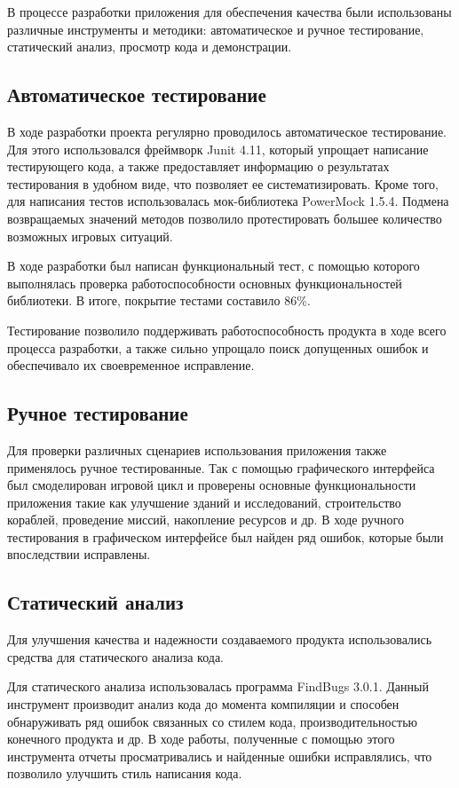 В процессе разработки приложения для обеспечения качества были использованы различные инструменты и методики: автоматическое и ручное тестирование, статический анализ, просмотр кода и демонстрации.

\subsection{Автоматическое тестирование}

В ходе разработки проекта регулярно проводилось автоматическое тестирование. Для этого использовался фреймворк Junit 4.11, который упрощает написание тестирующего кода, а также предоставляет информацию о результатах тестирования в удобном виде, что позволяет ее систематизировать. Кроме того, для написания тестов использовалась мок-библиотека PowerMock 1.5.4. Подмена возвращаемых значений методов позволило протестировать большее количество возможных игровых ситуаций. 

В ходе разработки был написан функциональный тест, с помощью которого выполнялась проверка работоспособности основных функциональностей библиотеки. В итоге, покрытие тестами составило 86\%.

Тестирование позволило поддерживать работоспособность продукта в ходе всего процесса разработки, а также сильно упрощало поиск допущенных ошибок и обеспечивало их своевременное исправление.   

\subsection{Ручное тестирование}
Для проверки различных сценариев использования приложения также применялось ручное тестированные. Так с помощью графического интерфейса был смоделирован игровой цикл и проверены основные функциональности приложения такие как улучшение зданий и исследований, строительство кораблей, проведение миссий, накопление ресурсов и др. В ходе ручного тестирования в графическом интерфейсе был найден ряд ошибок, которые были впоследствии исправлены. 

\subsection{Статический анализ}

Для улучшения качества и надежности создаваемого продукта использовались средства для статического анализа кода.

Для статического анализа использовалась программа FindBugs 3.0.1. Данный инструмент производит анализ кода до момента компиляции и способен обнаруживать ряд ошибок связанных со стилем кода, производительностью конечного продукта и др. В ходе работы, полученные с помощью этого инструмента отчеты просматривались и найденные ошибки исправлялись, что позволило улучшить стиль написания кода.

